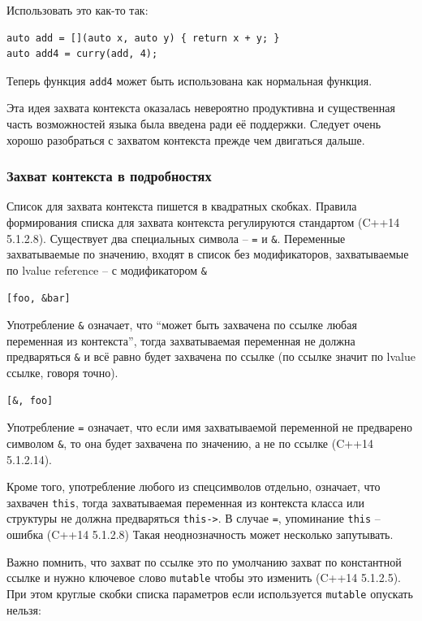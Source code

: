 \documentclass[a4paper,12pt,oneside]{article}
\begin{document}
Использовать это как-то так:

\begin{lstlisting}
auto add = [](auto x, auto y) { return x + y; }
auto add4 = curry(add, 4);
\end{lstlisting}

Теперь функция \lstinline!add4! может быть использована как нормальная функция.

Эта идея захвата контекста оказалась невероятно продуктивна и существенная часть возможностей языка была введена ради её поддержки. Следует очень хорошо разобраться с захватом контекста прежде чем двигаться дальше.

\subsubsection{Захват контекста в подробностях}\label{ContextCapture}

Список для захвата контекста пишется в квадратных скобках. Правила формирования списка для захвата контекста регулируются стандартом (C++14 5.1.2.8). Существует два специальных символа -- \lstinline!=! и \lstinline!&!. Переменные захватываемые по значению, входят в список без модификаторов, захватываемые по lvalue reference -- с модификатором \lstinline!&!

\begin{lstlisting}
[foo, &bar]
\end{lstlisting}

Употребление \lstinline!&! означает, что ``может быть захвачена по ссылке любая переменная из контекста'', тогда захватываемая переменная не должна предваряться \lstinline!&! и всё равно будет захвачена по ссылке (по ссылке значит по lvalue ссылке, говоря точно).

\begin{lstlisting}
[&, foo]
\end{lstlisting}

Употребление \lstinline!=! означает, что если имя захватываемой переменной не предварено символом \lstinline!&!, то она будет захвачена по значению, а не по ссылке (C++14 5.1.2.14). 

Кроме того, употребление любого из спецсимволов отдельно, означает, что захвачен \lstinline!this!, тогда захватываемая переменная из контекста класса или структуры не должна предваряться \lstinline!this->!. В случае \lstinline!=!, упоминание \lstinline!this! -- ошибка (C++14 5.1.2.8)  Такая неоднозначность может несколько запутывать.

Важно помнить, что захват по ссылке это по умолчанию захват по константной ссылке и нужно ключевое слово \lstinline!mutable! чтобы это изменить (C++14 5.1.2.5). При этом круглые скобки списка параметров если используется \lstinline!mutable! опускать нельзя:
\end{document}
